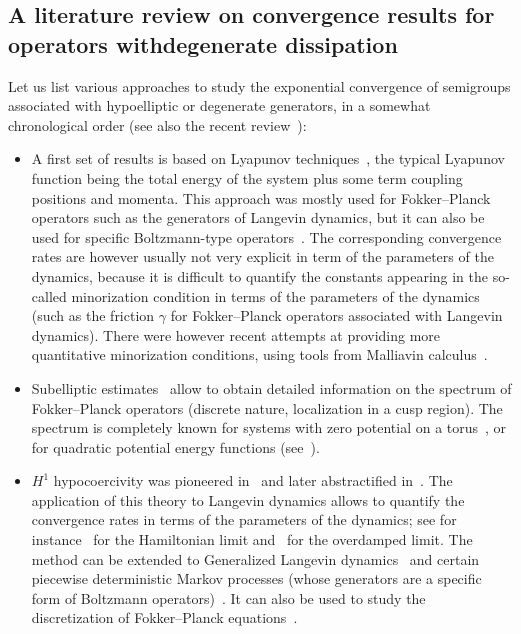 \documentclass[AHL,Unicode,longabstracts,MathTools,published]{cedram}
\begin{document}
\subsection*{A literature review on convergence results for operators with\linebreak degenerate dissipation}
Let us list various approaches to study the exponential convergence of semigroups associated with hypoelliptic or degenerate generators, in a somewhat chronological order (see also the recent review~\cite{Herau16}):
\begin{itemize}
\item A first set of results is based on Lyapunov techniques~\cite{MSH02,rey-bellet,Wu01}, the typical Lyapunov function being the total energy of the system plus some term coupling positions and momenta. This approach was mostly used for Fokker--Planck operators such as the generators of Langevin dynamics, but it can also be used for specific Boltzmann-type operators~\cite{BRSS17,CCEY19,CELMM}. The corresponding convergence rates are however usually not very explicit in term of the parameters of the dynamics, because it is difficult to quantify the constants appearing in the so-called minorization condition in terms of the parameters of the dynamics (such as the friction $\gamma$ for Fokker--Planck operators associated with Langevin dynamics). There were however recent attempts at providing more quantitative minorization conditions, using tools from Malliavin calculus~\cite{Ev18}.

\item Subelliptic estimates~\cite{EH03,HN04,HN05} allow to obtain detailed information on the spectrum of Fokker--Planck operators (discrete nature, localization in a cusp region). The spectrum is completely known for systems with zero potential on a torus~\cite{Kozlov89}, or for quadratic potential energy functions (see~\cite{MPP02,PavliotisBook}).

\item $H^1$ hypocoercivity was pioneered in~\cite{MN06,Talay02} and later abstractified in~\cite{Villani09}. The application of this theory to Langevin dynamics allows to quantify the convergence rates in terms of the parameters of the dynamics; see for instance~\cite{HP08} for the Hamiltonian limit and~\cite{LMS16,LS16} for the overdamped limit. The method can be extended to Generalized Langevin dynamics~\cite{OP11} and certain piecewise deterministic Markov processes (whose generators are a specific form of Boltzmann operators)~\cite{DPD18}. It can also be used to study the discretization of Fokker--Planck equations~\cite{DHL19,Georg18}.


\end{itemize}
\end{document}
